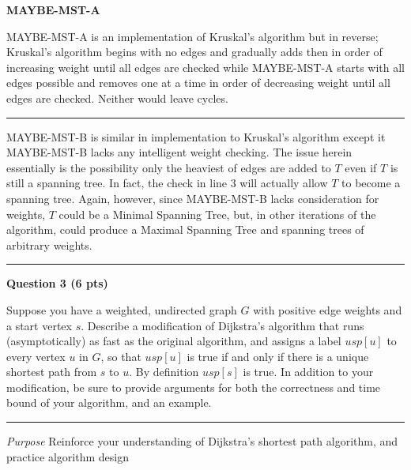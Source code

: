 \documentclass{article}
\newcommand\separator{\rule{\textwidth}{.2pt}}  %
\begin{document}

\textbf{MAYBE-MST-A}

MAYBE-MST-A is an implementation of Kruskal's algorithm but in reverse; 
Kruskal's algorithm begins with no edges and gradually adds then in order of 
increasing weight until all edges are checked while MAYBE-MST-A starts with all
edges possible and removes one at a time in order of decreasing weight until all
edges are checked. Neither would leave cycles. 

\separator

MAYBE-MST-B is similar in implementation to Kruskal's algorithm except it 
MAYBE-MST-B lacks any intelligent weight checking. The issue herein essentially
is the possibility only the heaviest of edges are added to $T$ even if $T$ is
still a spanning tree. In fact, the check in line 3 will actually allow $T$ to 
become a spanning tree. Again, however, since MAYBE-MST-B lacks consideration 
for weights, $T$ could be a Minimal Spanning Tree, but, in other iterations of
the algorithm, could produce a Maximal Spanning Tree and spanning trees of 
arbitrary weights. 

\separator



\newpage





\begin{framed}
    \textbf{Question 3 (6 pts)}

    Suppose you have a weighted, undirected graph $G$ with positive edge weights
    and a start vertex $s$. Describe a modification of Dijkstra’s algorithm that 
    runs (asymptotically) as fast as the original algorithm, and assigns a label 
    $usp[u]$ to every vertex $u$ in $G$, so that $usp[u]$ is true if and only if 
    there is a unique shortest path from $s$ to $u$. By definition $usp[s]$ is 
    true. In addition to your modification, be sure to provide arguments for 
    both the correctness and time bound of your algorithm, and an example.
    
    \separator

    \textit{Purpose} Reinforce your understanding of Dijkstra’s shortest path 
    algorithm, and practice algorithm design
    
\end{framed}
\end{document}
